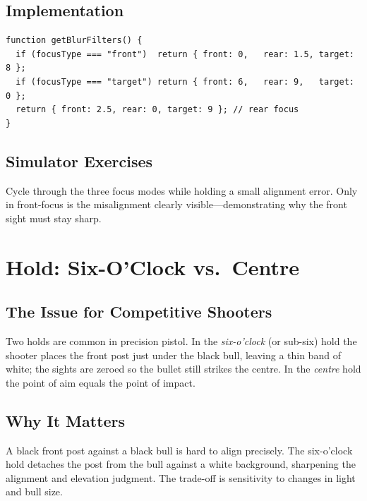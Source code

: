 \documentclass[11pt]{article}
\begin{document}
\subsection{Implementation}

\begin{lstlisting}
function getBlurFilters() {
  if (focusType === "front")  return { front: 0,   rear: 1.5, target: 8 };
  if (focusType === "target") return { front: 6,   rear: 9,   target: 0 };
  return { front: 2.5, rear: 0, target: 9 }; // rear focus
}
\end{lstlisting}

\subsection{Simulator Exercises}

Cycle through the three focus modes while holding a small alignment error.
Only in front-focus is the misalignment clearly visible---demonstrating why
the front sight must stay sharp.

\section{Hold: Six-O'Clock vs.\ Centre}\label{sec:hold}

\subsection{The Issue for Competitive Shooters}

Two holds are common in precision pistol.  In the \emph{six-o'clock} (or
sub-six) hold the shooter places the front post just under the black bull,
leaving a thin band of white; the sights are zeroed so the bullet still
strikes the centre.  In the \emph{centre} hold the point of aim equals the
point of impact.

\subsection{Why It Matters}

A black front post against a black bull is hard to align precisely.  The
six-o'clock hold detaches the post from the bull against a white
background, sharpening the alignment and elevation judgment.  The trade-off
is sensitivity to changes in light and bull size.
\end{document}
